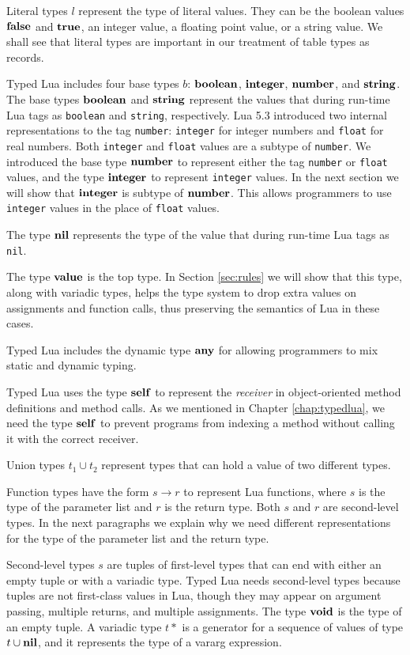 Literal types $l$ represent the type of literal values.
They can be the boolean values $\mathbf{false}$ and $\mathbf{true}$,
an integer value, a floating point value, or a string value.
We shall see that literal types are important in our treatment of
table types as records.

Typed Lua includes four base types $b$: $\mathbf{boolean}$, $\mathbf{integer}$, $\mathbf{number}$, and $\mathbf{string}$.
The base types $\mathbf{boolean}$ and $\mathbf{string}$ represent the values that during
run-time Lua tags as \texttt{boolean} and \texttt{string}, respectively.
Lua 5.3 introduced two internal representations to the tag \texttt{number}:
\texttt{integer} for integer numbers and \texttt{float} for real numbers.
Both \texttt{integer} and \texttt{float} values are a subtype of \texttt{number}.
We introduced the base type $\mathbf{number}$ to represent either the tag
\texttt{number} or \texttt{float} values, and the type $\mathbf{integer}$ to represent
\texttt{integer} values.
In the next section we will show that $\mathbf{integer}$ is subtype of $\mathbf{number}$.
This allows programmers to use \texttt{integer} values in the
place of \texttt{float} values.

The type $\mathbf{nil}$ represents the type of the value that during run-time
Lua tags as \texttt{nil}.

The type $\mathbf{value}$ is the top type.
In Section \ref{sec:rules} we will show that this type,
along with variadic types, helps the type system to drop extra values
on assignments and function calls, thus preserving the
semantics of Lua in these cases.

Typed Lua includes the dynamic type $\mathbf{any}$ for allowing programmers
to mix static and dynamic typing.

Typed Lua uses the type $\mathbf{self}$ to represent the \emph{receiver}
in object-oriented method definitions and method calls.
As we mentioned in Chapter \ref{chap:typedlua}, we need the type
$\mathbf{self}$ to prevent programs from indexing a method without
calling it with the correct receiver.

Union types $t_{1} \cup t_{2}$ represent types that can hold a value
of two different types.

Function types have the form $s \rightarrow r$ to represent Lua functions,
where $s$ is the type of the parameter list and $r$ is the return type.
Both $s$ and $r$ are second-level types.
In the next paragraphs we explain why we need different representations
for the type of the parameter list and the return type.

Second-level types $s$ are tuples of first-level types that can end
with either an empty tuple or with a variadic type.
Typed Lua needs second-level types because tuples are not first-class
values in Lua, though they may appear on argument passing,
multiple returns, and multiple assignments.
The type $\mathbf{void}$ is the type of an empty tuple.
A variadic type $t*$ is a generator for a sequence of values
of type $t \cup \mathbf{nil}$, and it represents the type of a vararg expression.

